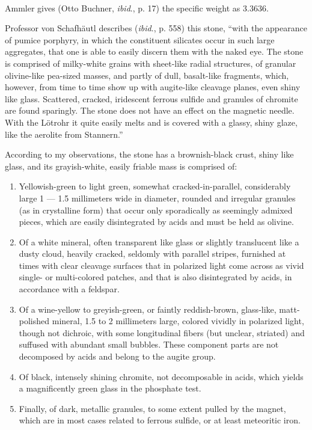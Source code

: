 \documentclass[a4paper, 12pt, oneside]{article}
\begin{document}
\paragraph*{}
Ammler gives (Otto Buchner, \emph{ibid}., p. 17) the specific weight as 3.3636.

Professor von Schafhäutl describes (\emph{ibid}., p. 558) this stone, ``with the appearance of pumice porphyry, in which the constituent silicates occur in such large aggregates, that one is able to easily discern them with the naked eye. The stone is comprised of milky-white grains with sheet-like radial structures, of granular olivine-like pea-sized masses, and partly of dull, basalt-like fragments, which, however, from time to time show up with augite-like cleavage planes, even shiny like glass. Scattered, cracked, iridescent ferrous sulfide and granules of chromite are found sparingly. The stone does not have an effect on the magnetic needle. With the Lötrohr it quite easily melts and is covered with a glassy, shiny glaze, like the aerolite from Stannern.''

According to my observations, the stone has a brownish-black crust, shiny like glass, and its grayish-white, easily friable mass is comprised of:
\begin{enumerate}
    \item Yellowish-green to light green, somewhat cracked-in-parallel, considerably large 1 --- 1.5 millimeters wide in diameter, rounded and irregular granules (as in crystalline form) that occur only sporadically as seemingly admixed pieces, which are easily disintegrated by acids and must be held as olivine.
    \item Of a white mineral, often transparent like glass or slightly translucent like a dusty cloud, heavily cracked, seldomly with parallel stripes, furnished at times with clear cleavage surfaces that in polarized light come across as vivid single- or multi-colored patches, and that is also disintegrated by acids, in accordance with a feldspar.
    \item Of a wine-yellow to greyish-green, or faintly reddish-brown, glass-like, matt-polished mineral, 1.5 to 2 millimeters large, colored vividly in polarized light, though not dichroic, with some longitudinal fibers (but unclear, striated) and suffused with abundant small bubbles. These component parts are not decomposed by acids and belong to the augite group.
    \item Of black, intensely shining chromite, not decomposable in acids, which yields a magnificently green glass in the phosphate test.
    \item Finally, of dark, metallic granules, to some extent pulled by the magnet, which are in most cases related to ferrous sulfide, or at least meteoritic iron.
\end{enumerate}
\end{document}
